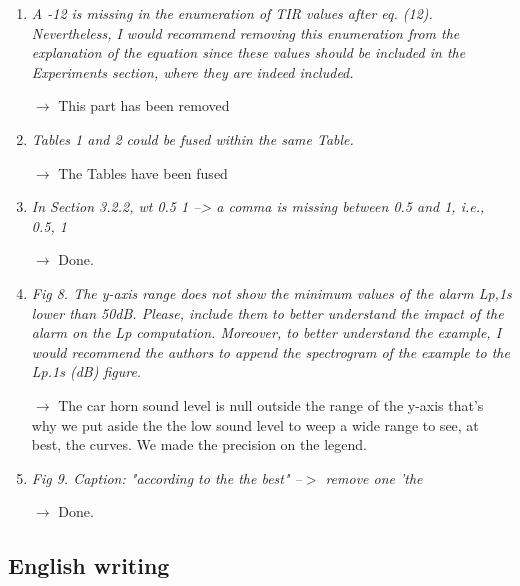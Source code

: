 \documentclass[10pt]{article}
\begin{document}
\begin{enumerate}
\item \emph{A -12 is missing in the enumeration of TIR values after eq. (12). Nevertheless, I would recommend removing this enumeration from the explanation of the equation since these values should be included in the Experiments section, where they are indeed included.}

$\rightarrow$ This part has been removed

\item \emph{Tables 1 and 2 could be fused within the same Table.}

$\rightarrow$ The Tables have been fused

\item \emph{In Section 3.2.2, wt {0.5 1} --> a comma is missing between 0.5 and 1, i.e., {0.5, 1} }

$\rightarrow$ Done.

\item \emph{Fig 8. The y-axis range does not show the minimum values of the alarm Lp,1s lower than 50dB. Please, include them to better understand the impact of the alarm on the Lp computation. Moreover, to better understand the example, I would recommend the authors to append the spectrogram of the example to the Lp.1s (dB) figure.}

$\rightarrow$ The car horn sound level is null outside the range of the y-axis that's why we put aside the the low sound level to weep a wide range to see, at best, the curves. We made the precision on the legend.

\item \emph{Fig 9. Caption: "according to the the best" --$>$ remove one 'the}

$\rightarrow$ Done.

\end{enumerate}
\subsection{English writing}
\end{document}
